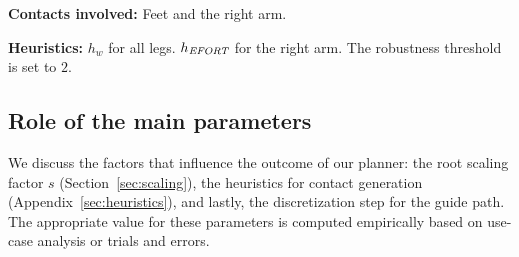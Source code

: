 \noindent\textbf{Contacts involved:} Feet and the right arm.

\noindent\textbf{Heuristics:} $h_w$  for all legs. $h_{\textrm{\it EFORT}}$  for the right arm. The robustness threshold is set to $2$.



 
 
\subsection{Role of the main parameters} \label{sec:influence}
We discuss the factors that influence the outcome of our planner: the root scaling factor $s$ (Section~\ref{sec:scaling}), the heuristics for
contact generation (Appendix~\ref{sec:heuristics}), and lastly, the discretization step for the guide path. The appropriate value for these parameters
is computed empirically based on use-case analysis or trials and errors.
 
